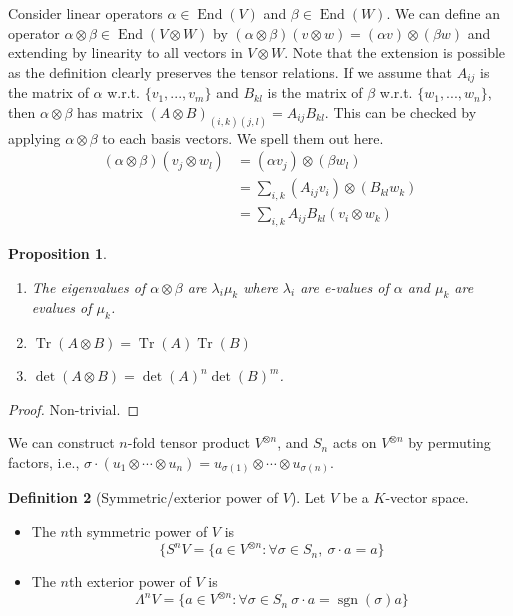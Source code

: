 \documentclass{article}
\theoremstyle{definition}
\newtheorem{defn}{Definition}[section]
\theoremstyle{remark}
\theoremstyle{plain}
\newtheorem{prop}[defn]{Proposition}
\begin{document}
Consider linear operators $\alpha\in\operatorname{End}(V)$ and $\beta\in \operatorname{End}(W)$. We can define an operator $\alpha\otimes \beta\in\operatorname{End}(V\otimes W)$ by $(\alpha\otimes \beta)(v\otimes w)=(\alpha v)\otimes (\beta w)$ and extending by linearity to all vectors in $V\otimes W$. Note that the extension is possible as the definition clearly preserves the tensor relations. If we assume that $A_{ij}$ is the matrix of $\alpha$ w.r.t. $\{v_1,...,v_m\}$ and $B_{kl}$ is the matrix of $\beta$ w.r.t. $\{w_1,...,w_n\}$, then $\alpha\otimes \beta$ has matrix $(A\otimes B)_{(i,k)(j,l)}=A_{ij}B_{kl}$. This can be checked by applying $\alpha\otimes\beta$ to each basis vectors. We spell them out here.
\begin{align*}
    (\alpha\otimes\beta)(v_j\otimes w_l)&=(\alpha v_j)\otimes (\beta w_l)\\
    &=\sum_{i,k}(A_{ij}v_i)\otimes(B_{kl}w_k)\\
    &=\sum_{i,k}A_{ij}B_{kl}(v_i\otimes w_k)
\end{align*}
\begin{prop}
    \begin{enumerate}
        \item The eigenvalues of $\alpha\otimes\beta$ are $\lambda_i\mu_k$ where $\lambda_i$ are e-values of $\alpha$ and $\mu_k$ are evalues of $\mu_k$.
        \item $\operatorname{Tr}(A\otimes B)=\operatorname{Tr}(A)\operatorname{Tr}(B)$
        \item $\det(A\otimes B)=\det(A)^n\det(B)^m$.
    \end{enumerate}
\end{prop}
\begin{proof}
    Non-trivial.
\end{proof}
We can construct $n$-fold tensor product $V^{\otimes n}$, and $S_n$ acts on $V^{\otimes n}$ by permuting factors, i.e., $\sigma\cdot (u_1\otimes\cdots\otimes u_n)=u_{\sigma(1)}\otimes \cdots\otimes u_{\sigma(n)}$.
\begin{defn}[Symmetric/exterior power of $V$]
Let $V$ be a $K$-vector space.
    \begin{itemize}
        \item The $n$th symmetric power of $V$ is
        \[\{S^nV=\{a\in V^{\otimes n}:\forall \sigma\in S_n,\ \sigma\cdot a=a\}\]
        \item The $n$th exterior power of $V$ is
        \[\Lambda^nV=\{a\in V^{\otimes n}:\forall\sigma\in S_n\ \sigma\cdot a=\operatorname{sgn}(\sigma)a\}\]
    \end{itemize}
\end{defn}
\end{document}
